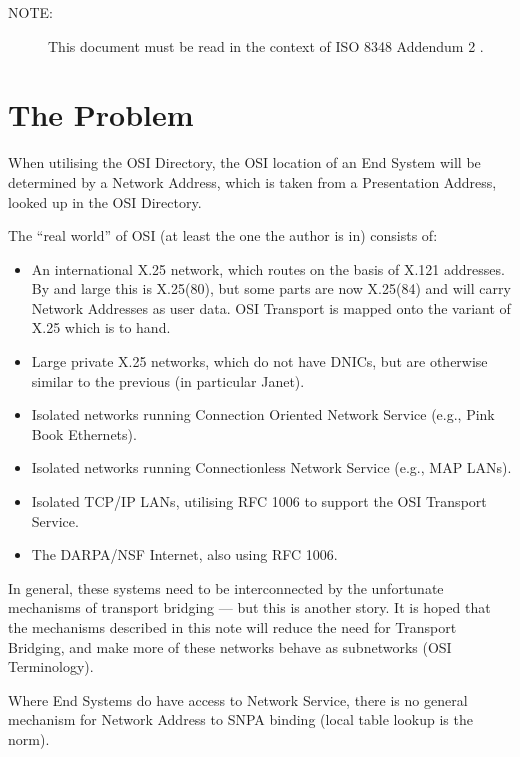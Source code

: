 \begin {description}
\item[NOTE:] This document must be read in the context of ISO 8348 Addendum 2
\cite{ISO.Naming}.
\end {description}


\section {The Problem}

When utilising the OSI Directory, the OSI location of an End System
will be determined by a Network Address, which is taken from a
Presentation Address, looked up in the OSI Directory.   

The ``real world'' of OSI (at least the one the author is in) consists of:

\begin {itemize}
\item An international X.25 network, which routes on the basis of
X.121 addresses. By and large this is X.25(80), but some parts are
now X.25(84) and will carry Network Addresses as user data.  OSI
Transport is mapped onto the variant of X.25 which is to hand.

\item Large private X.25 networks, which do not have DNICs, but are
otherwise similar to the previous (in particular Janet). 

\item Isolated networks running Connection Oriented Network Service
(e.g., Pink Book Ethernets).

\item Isolated networks running Connectionless Network Service
(e.g., MAP LANs).

\item Isolated TCP/IP LANs, utilising RFC 1006 to
support the OSI Transport Service\cite{RFC-1006}.

\item The DARPA/NSF Internet, also using RFC 1006.
\end {itemize}

In general, these systems need to be interconnected by the
unfortunate mechanisms of transport bridging --- but this is another
story.  It is hoped that the mechanisms described in this note will
reduce the need for Transport Bridging, and make more of these
networks behave as subnetworks (OSI Terminology).

Where End Systems do have access to Network Service, there is no
general mechanism for Network Address to SNPA binding (local table
lookup is the norm).

